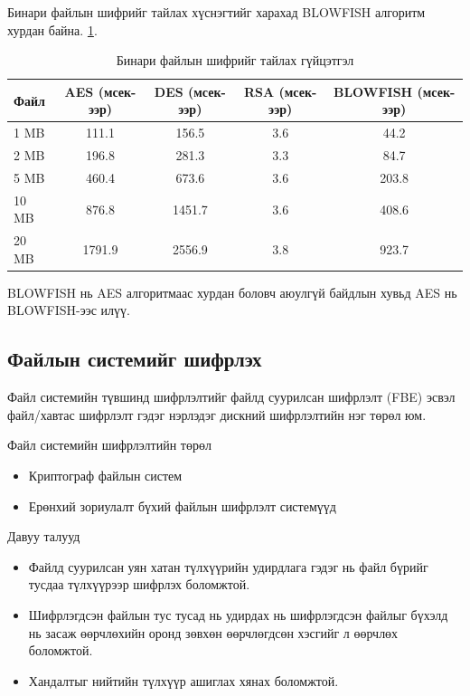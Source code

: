 Бинари файлын шифрийг тайлах хүснэгтийг харахад BLOWFISH алгоритм хурдан байна. \ref{tab:decrypt_performance_binary}.
\begin{table}[H]
  \centering
  \footnotesize
  \begin{tabular}{|l|c|c|c|c|}
    \hline
    \textbf{Файл} & \textbf{AES (мсек-ээр)} & \textbf{DES (мсек-ээр)} & \textbf{RSA (мсек-ээр)} & \textbf{BLOWFISH (мсек-ээр)} \\
    \hline
    1 MB & 111.1 & 156.5 & 3.6 & 44.2 \\
    \hline
    2 MB & 196.8 & 281.3 & 3.3 & 84.7 \\
    \hline
    5 MB & 460.4 & 673.6 & 3.6 & 203.8 \\
    \hline
    10 MB & 876.8 & 1451.7 & 3.6 & 408.6 \\
    \hline
    20 MB & 1791.9 & 2556.9 & 3.8 & 923.7 \\
    \hline
  \end{tabular}
  \caption{Бинари файлын шифрийг тайлах гүйцэтгэл}
  \label{tab:decrypt_performance_binary}
\end{table}
BLOWFISH нь AES алгоритмаас хурдан боловч аюулгүй байдлын хувьд AES нь BLOWFISH-ээс илүү.

\subsection*{Файлын системийг шифрлэх}
Файл системийн түвшинд шифрлэлтийг файлд суурилсан шифрлэлт (FBE) эсвэл файл/хавтас шифрлэлт гэдэг нэрлэдэг дискний шифрлэлтийн нэг төрөл юм.\cite{WikiEnFileSystem}

Файл системийн шифрлэлтийн төрөл
\begin{itemize}
    \item Криптограф файлын систем
    \item Ерөнхий зориулалт бүхий файлын шифрлэлт системүүд
\end{itemize}

Давуу талууд
\begin{itemize}
    \item Файлд суурилсан уян хатан түлхүүрийн удирдлага гэдэг нь файл бүрийг тусдаа түлхүүрээр шифрлэх боломжтой.
    \item Шифрлэгдсэн файлын тус тусад нь удирдах нь шифрлэгдсэн файлыг бүхэлд нь засаж өөрчлөхийн оронд зөвхөн өөрчлөгдсөн хэсгийг л өөрчлөх боломжтой.
    \item Хандалтыг нийтийн түлхүүр ашиглах хянах боломжтой.
\end{itemize}

